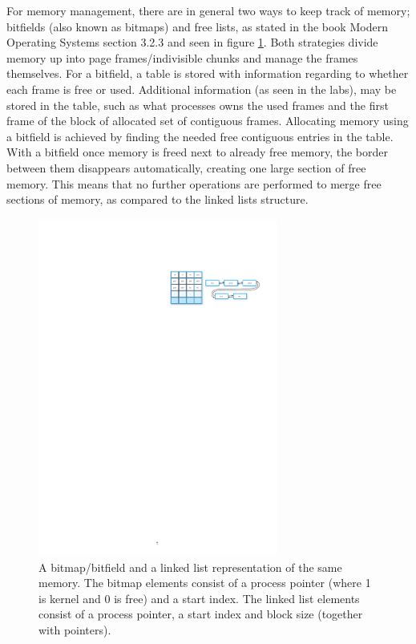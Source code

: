 For memory management, there are in general two ways to keep track of memory; bitfields (also known as bitmaps) and free lists, as stated in the book Modern Operating Systems section 3.2.3 \cite{tanembaum} and seen in figure \ref{fig:mapvslist}. Both strategies divide memory up into page frames/indivisible chunks and manage the frames themselves. For a bitfield, a table is stored with information regarding to whether each frame is free or used. Additional information (as seen in the labs), may be stored in the table, such as what processes owns the used frames and the first frame of the block of allocated set of contiguous frames. Allocating memory using a bitfield is achieved by finding the needed free contiguous entries in the table. With a bitfield once memory is freed next to already free memory, the border between them disappears automatically, creating one large section of free memory. This means that no further operations are performed to merge free sections of memory, as compared to the linked lists structure.

\begin{figure}
    \centering
    \includegraphics[width=0.7\textwidth]{fig/bitmatvslist.pdf}
    \caption{A bitmap/bitfield and a linked list representation of the same memory. The bitmap elements consist of a process pointer (where 1 is kernel and 0 is free) and a start index. The linked list elements consist of a process pointer, a start index and block size (together with pointers).}
    \label{fig:mapvslist}
\end{figure}

